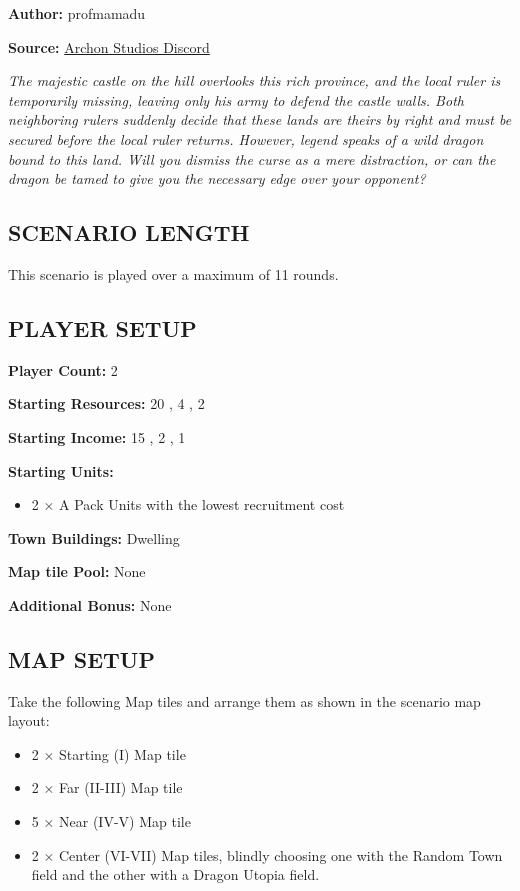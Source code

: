 
\begin{multicols*}{2}

\textbf{Author:} profmamadu

\textbf{Source:} \href{https://discord.com/channels/740870068178649108/1253016693517717714/1253016693517717714}{Archon Studios Discord}

\textit{The majestic castle on the hill overlooks this rich province, and the local ruler is temporarily missing, leaving only his army to defend the castle walls.
Both neighboring rulers suddenly decide that these lands are theirs by right and must be secured before the local ruler returns.
However, legend speaks of a wild dragon bound to this land.
Will you dismiss the curse as a mere distraction, or can the dragon be tamed to give you the necessary edge over your opponent?
}

\subsection*{\MakeUppercase{Scenario Length}}

This scenario is played over a maximum of 11 rounds.

\subsection*{\MakeUppercase{Player Setup}}

\textbf{Player Count:} 2

\textbf{Starting Resources:} 20 , 4 , 2 

\textbf{Starting Income:} 15 , 2 , 1 

\textbf{Starting Units:}
\begin{itemize}
  \item 2 × A Pack  Units with the lowest recruitment cost
\end{itemize}

\textbf{Town Buildings:}  Dwelling

\textbf{Map tile Pool:} None

\textbf{Additional Bonus:} None

\subsection*{\MakeUppercase{Map Setup}}
Take the following Map tiles and arrange them as shown in the scenario map layout:
\begin{itemize}
  \item 2 × Starting (I) Map tile
  \item 2 × Far (II-III) Map tile
  \item 5 × Near (IV-V) Map tile
  \item 2 × Center (VI-VII) Map tiles, blindly choosing one with the Random Town field and the other with a Dragon Utopia field.
\end{itemize}


\end{multicols*}
